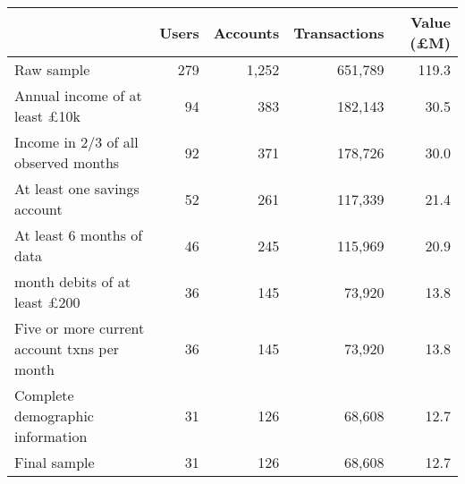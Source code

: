 \begin{tabular}{lrrrr}
\toprule
                                            & Users & Accounts & Transactions & Value (\pounds M) \\
\midrule
                                 Raw sample &   279 &    1,252 &      651,789 &             119.3 \\
       Annual income of at least \pounds10k &    94 &      383 &      182,143 &              30.5 \\
       Income in 2/3 of all observed months &    92 &      371 &      178,726 &              30.0 \\
               At least one savings account &    52 &      261 &      117,339 &              21.4 \\
                  At least 6 months of data &    46 &      245 &      115,969 &              20.9 \\
        month debits of at least \pounds200 &    36 &      145 &       73,920 &              13.8 \\
Five or more current account txns per month &    36 &      145 &       73,920 &              13.8 \\
           Complete demographic information &    31 &      126 &       68,608 &              12.7 \\
                               Final sample &    31 &      126 &       68,608 &              12.7 \\
\bottomrule
\end{tabular}
